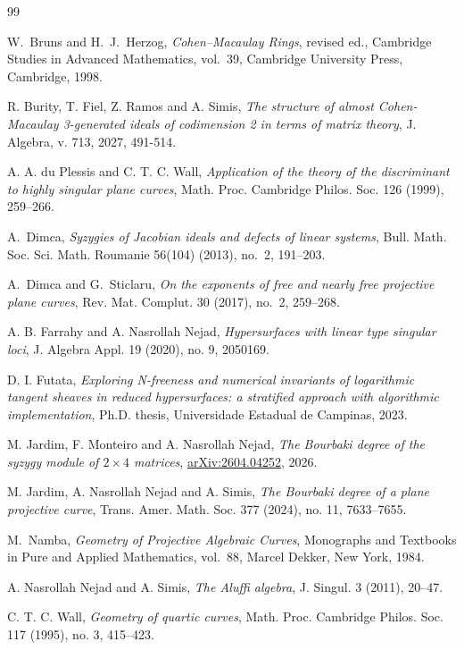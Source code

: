 \documentclass[11pt]{amsart} %
\theoremstyle{definition}
\begin{document}
\begin{thebibliography}{99}

W.~Bruns and H.~J.~Herzog,
\emph{Cohen--Macaulay Rings},
revised ed., Cambridge Studies in Advanced Mathematics, vol.~39,
Cambridge University Press, Cambridge, 1998.


R. Burity, T. Fiel, Z. Ramos and A. Simis,
\emph{The structure of almost Cohen-Macaulay 3-generated ideals of codimension 2 in terms of matrix theory},
J. Algebra, v. 713, 2027, 491-514.

A. A. du Plessis and C. T. C. Wall,
\emph{Application of the theory of the discriminant to highly singular plane curves},
Math. Proc. Cambridge Philos. Soc.
126 (1999), 259--266.

A.~Dimca,
\emph{Syzygies of Jacobian ideals and defects of linear systems},
Bull. Math. Soc. Sci. Math. Roumanie
56(104) (2013), no.~2, 191--203.

A.~Dimca and G.~Sticlaru,
\emph{On the exponents of free and nearly free projective plane curves},
Rev. Mat. Complut. 30 (2017), no.~2, 259--268.

A. B. Farrahy and A. Nasrollah Nejad,
\emph{Hypersurfaces with linear type singular loci},
J. Algebra Appl. 19 (2020), no. 9, 2050169.

D. I. Futata,
\emph{Exploring N-freeness and numerical invariants of logarithmic tangent sheaves in reduced hypersurfaces: a stratified approach with algorithmic implementation},
Ph.D. thesis,
Universidade Estadual de Campinas,
2023.

M. Jardim, F. Monteiro and A. Nasrollah Nejad,
\emph{The Bourbaki degree of the syzygy module of $2\times 4$ matrices},
\href{https://arxiv.org/abs/2604.04252}{arXiv:2604.04252}, 2026.

M. Jardim, A. Nasrollah Nejad and A. Simis,
\emph{The Bourbaki degree of a plane projective curve},
Trans. Amer. Math. Soc. 377 (2024), no. 11, 7633--7655.

M.~Namba,
\emph{Geometry of Projective Algebraic Curves},
Monographs and Textbooks in Pure and Applied Mathematics, vol.~88,
Marcel Dekker, New York, 1984.

A. Nasrollah Nejad and A. Simis,
\emph{The Aluffi algebra},
J. Singul. 3 (2011), 20--47.

C. T. C. Wall,
\emph{Geometry of quartic curves},
Math. Proc. Cambridge Philos. Soc. 117 (1995), no. 3, 415--423.

\end{thebibliography}
\end{document}
